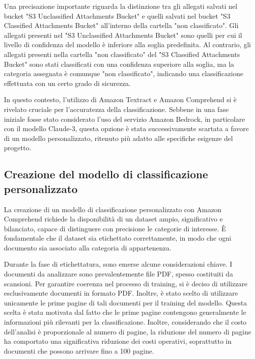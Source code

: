 Una precisazione importante riguarda la distinzione tra gli allegati salvati nel bucket "S3 Unclassified Attachments Bucket" e quelli salvati nel bucket "S3 Classified Attachments Bucket" all'interno della cartella "non classificato". Gli allegati presenti nel "S3 Unclassified Attachments Bucket" sono quelli per cui il livello di confidenza del modello è inferiore alla soglia predefinita. Al contrario, gli allegati presenti nella cartella "non classificato" del "S3 Classified Attachments Bucket" sono stati classificati con una confidenza superiore alla soglia, ma la categoria assegnata è comunque "non classificato", indicando una classificazione effettuata con un certo grado di sicurezza.

In questo contesto, l'utilizzo di Amazon Textract e Amazon Comprehend si è rivelato cruciale per l'accuratezza della classificazione. Sebbene in una fase iniziale fosse stato considerato l'uso del servizio Amazon Bedrock, in particolare con il modello Claude-3, questa opzione è stata successivamente scartata a favore di un modello personalizzato, ritenuto più adatto alle specifiche esigenze del progetto.
\subsection{Creazione del modello di classificazione personalizzato}
\label{subsec:training-modello}
La creazione di un modello di classificazione personalizzato con Amazon Comprehend richiede la disponibilità di un dataset ampio, significativo e bilanciato, capace di distinguere con precisione le categorie di interesse. È fondamentale che il dataset sia etichettato correttamente, in modo che ogni documento sia associato alla categoria di appartenenza.

Durante la fase di etichettatura, sono emerse alcune considerazioni chiave. I documenti da analizzare sono prevalentemente file PDF, spesso costituiti da scansioni. Per garantire coerenza nel processo di training, si è deciso di utilizzare esclusivamente documenti in formato PDF. Inoltre, è stato scelto di utilizzare unicamente le prime pagine di tali documenti per il training del modello. Questa scelta è stata motivata dal fatto che le prime pagine contengono generalmente le informazioni più rilevanti per la classificazione. Inoltre, considerando che il costo dell'analisi è proporzionale al numero di pagine, la riduzione del numero di pagine ha comportato una significativa riduzione dei costi operativi, soprattutto in documenti che possono arrivare fino a 100 pagine.

